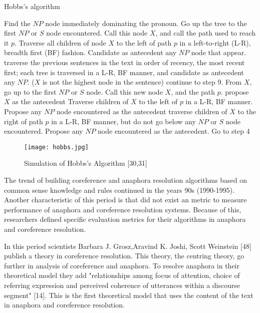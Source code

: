 \newpage
\begin{algorithm}[H]
\caption{Hobbs's algorithm}\label{alg:Hobbs}
\begin{algorithmic}[1]
\State Find the $NP$ node immediately dominating the pronoun.
\State Go up the tree to the first $NP$ or $S$ node encountered. Call this node $X$, and call the path used to reach it $p$.
\State Traverse all children of node $X$ to the left of path $p$ in a left-to-right (L-R), breadth first (BF) fashion. Candidate as antecedent any $NP$ node that appear.
	\State traverse the previous sentences in the text in order of recency, the most recent first; each tree is traversed in a L-R, BF manner, and candidate as antecedent any $NP$.
\Else
	\State ($X$ is not the highest node in the sentence) continue to step 9.
\EndIf
\State From $X$, go up to the first $NP$ or $S$ node. Call this new node $X$, and the path $p$.
     \State propose $X$ as the antecedent
\EndIf
\State Traverse children of $X$ to the left of $p$ in a L-R, BF manner. Propose any $NP$ node encountered as the antecedent
    \State traverse children of $X$ to the right of path $p$ in a L-R, BF manner, but do not go below any $NP$ or $S$ node encountered.
    \State Propose any $NP$ node encountered as the antecedent.
\EndIf
\State Go to step 4
\end{algorithmic}
\end{algorithm}

\begin{figure}[h]
	\texttt{[image: hobbs.jpg]} 
 	\caption{Simulation of Hobbs's Algorithm [30,31] }
	\label{Figure 5}
\end{figure}

The trend of building coreference and anaphora resolution algorithms based on common sense knowledge and rules continued in the years 90s (1990-1995). Another characteristic of this period is that did not exist an metric to measure performance of anaphora and coreference resolution systems. Because of this, researchers defined specific evaluation metrics for their algorithms in anaphora and coreference resolution.

In this period scientists Barbara J. Grosz,Aravind K. Joshi, Scott Weinstein [48] publish a theory in coreference resolution. This theory, the centring theory, go further in analysis of coreference and anaphora. To resolve anaphora in their theoretical model they add "relationships among focus of attention, choice of referring expression and perceived coherence of utterances within a discourse segment" [14]. This is the first theoretical model that uses the content of the text in anaphora and coreference resolution.


